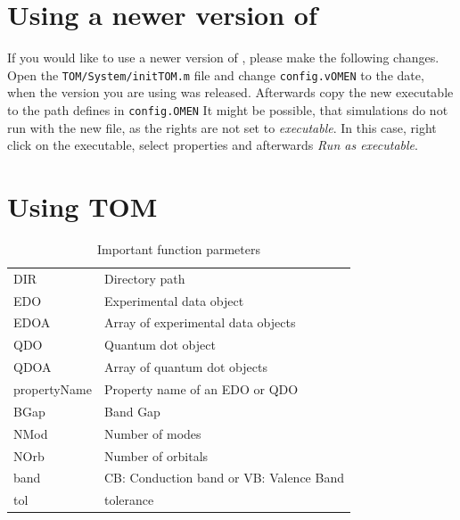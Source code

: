 	\section{Using a newer version of \omen}
		If you would like to use a newer version of \omen, please make the following changes. Open the \lstinline{TOM/System/initTOM.m} file
		and change \lstinline{config.vOMEN} to the date, when the \omen version you are using was released. Afterwards copy the new \omen executable
		to the path defines in \lstinline{config.OMEN}
		It might be possible, that simulations do not run with the new file, as the rights are not set to {\it executable}. In this case, right click on
		the executable, select properties and afterwards {\it Run as executable}. 
	
	\section{Using TOM}
	
		\begin{table}[htbp]
			\centering
			\begin{tabular}{ll}
				DIR						&	Directory path														\\
				EDO						& Experimental data object									\\
				EDOA					& Array of experimental data objects				\\
				QDO						& Quantum dot object												\\
				QDOA					&	Array of quantum dot objects							\\
				propertyName	& Property name of an EDO or QDO						\\
				BGap					& Band Gap																	\\
				NMod					& Number of modes														\\
				NOrb					& Number of orbitals												\\
				band					& CB: Conduction band or VB: Valence Band		\\
				tol						& tolerance																	\\
			\end{tabular}
			\caption{Important function parmeters}
			\label{tbl:functionParmeters}
		\end{table}
				
	
